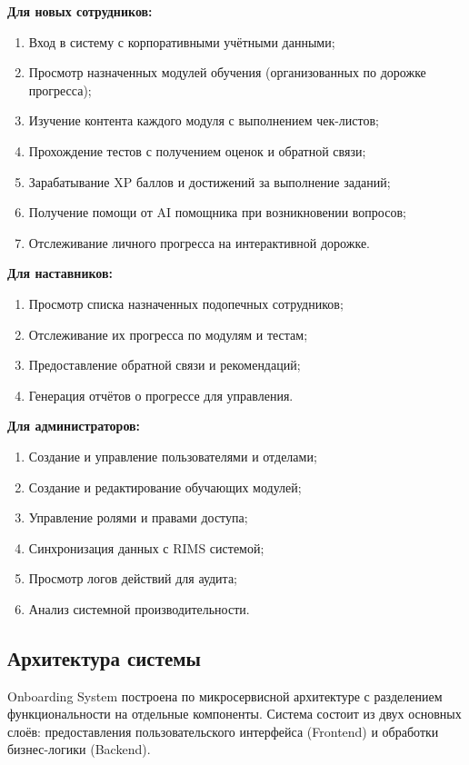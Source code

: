 \textbf{Для новых сотрудников:}
\begin{enumerate}
    \item Вход в систему с корпоративными учётными данными;
    \item Просмотр назначенных модулей обучения (организованных по дорожке прогресса);
    \item Изучение контента каждого модуля с выполнением чек-листов;
    \item Прохождение тестов с получением оценок и обратной связи;
    \item Зарабатывание XP баллов и достижений за выполнение заданий;
    \item Получение помощи от AI помощника при возникновении вопросов;
    \item Отслеживание личного прогресса на интерактивной дорожке.
\end{enumerate}

\textbf{Для наставников:}
\begin{enumerate}
    \item Просмотр списка назначенных подопечных сотрудников;
    \item Отслеживание их прогресса по модулям и тестам;
    \item Предоставление обратной связи и рекомендаций;
    \item Генерация отчётов о прогрессе для управления.
\end{enumerate}

\textbf{Для администраторов:}
\begin{enumerate}
    \item Создание и управление пользователями и отделами;
    \item Создание и редактирование обучающих модулей;
    \item Управление ролями и правами доступа;
    \item Синхронизация данных с RIMS системой;
    \item Просмотр логов действий для аудита;
    \item Анализ системной производительности.
\end{enumerate}


\subsection{Архитектура системы}

Onboarding System построена по микросервисной архитектуре с разделением функциональности на отдельные компоненты. Система состоит из двух основных слоёв: предоставления пользовательского интерфейса (Frontend) и обработки бизнес-логики (Backend).

